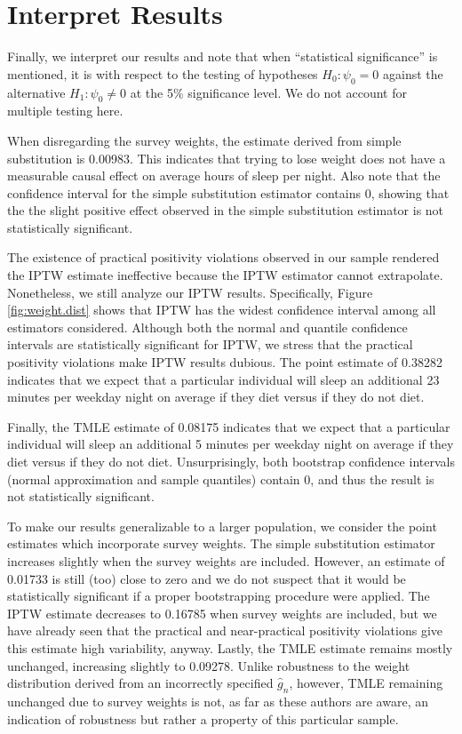 \documentclass{article}
\begin{document}
\section{Interpret Results}

Finally, we interpret our results and note that when ``statistical significance'' is mentioned, it is with respect to the testing of hypotheses $H_0 : \psi_0 = 0$ against the alternative $H_1 : \psi_{0} \neq 0$ at the 5\% significance level. We do not account for multiple testing here.

When disregarding the survey weights, the estimate derived from simple substitution is 0.00983. This indicates that trying to lose weight does not have a measurable causal effect on average hours of sleep per night. Also note that the confidence interval for the simple substitution estimator contains $0$, showing that the the slight positive effect observed in the simple substitution estimator is not statistically significant.

The existence of practical positivity violations observed in our sample rendered the IPTW estimate ineffective because the IPTW estimator cannot extrapolate. Nonetheless, we still analyze our IPTW results. Specifically, Figure \ref{fig:weight.dist} shows that IPTW has the widest confidence interval among all estimators considered. Although both the normal and quantile confidence intervals are statistically significant for IPTW, we stress that the practical positivity violations make IPTW results dubious. The point estimate of 0.38282 indicates that we expect that a particular individual will sleep an additional 23 minutes per weekday night on average if they diet versus if they do not diet.

Finally, the TMLE estimate of 0.08175 indicates that we expect that a particular individual will sleep an additional 5 minutes per weekday night on average if they diet versus if they do not diet. Unsurprisingly, both bootstrap confidence intervals (normal approximation and sample quantiles) contain $0$, and thus the result is not statistically significant.

To make our results generalizable to a larger population, we consider the point estimates which incorporate survey weights. The simple substitution estimator increases slightly when the survey weights are included. However, an estimate of 0.01733 is still (too) close to zero and we do not suspect that it would be statistically significant if a proper bootstrapping procedure were applied. The IPTW estimate decreases to 0.16785 when survey weights are included, but we have already seen that the practical and near-practical positivity violations give this estimate high variability, anyway. Lastly, the TMLE estimate remains mostly unchanged, increasing slightly to 0.09278. Unlike robustness to the weight distribution derived from an incorrectly specified $\hat{g}_n$, however, TMLE remaining unchanged due to survey weights is not, as far as these authors are aware, an indication of robustness but rather a property of this particular sample.
\end{document}
